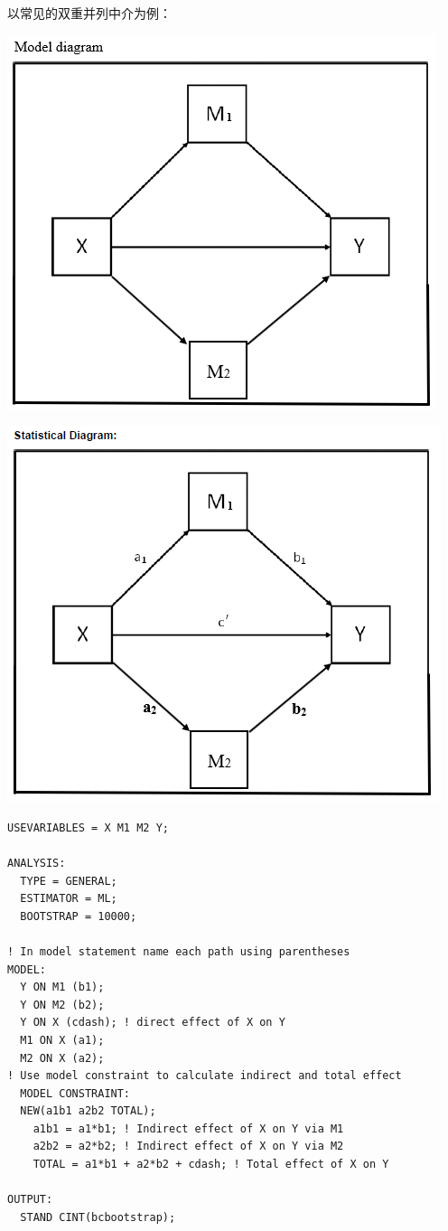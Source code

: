 \documentclass[
]{book}
\begin{document}
以常见的双重并列中介为例：

\includegraphics{figs/1133.png}

\includegraphics{figs/1134.png}

\begin{verbatim}
USEVARIABLES = X M1 M2 Y;

ANALYSIS:
  TYPE = GENERAL;
  ESTIMATOR = ML;
  BOOTSTRAP = 10000;

! In model statement name each path using parentheses
MODEL:
  Y ON M1 (b1);
  Y ON M2 (b2);
  Y ON X (cdash); ! direct effect of X on Y
  M1 ON X (a1);
  M2 ON X (a2);
! Use model constraint to calculate indirect and total effect
  MODEL CONSTRAINT:
  NEW(a1b1 a2b2 TOTAL);
    a1b1 = a1*b1; ! Indirect effect of X on Y via M1
    a2b2 = a2*b2; ! Indirect effect of X on Y via M2
    TOTAL = a1*b1 + a2*b2 + cdash; ! Total effect of X on Y

OUTPUT:
  STAND CINT(bcbootstrap);
\end{verbatim}
\end{document}
